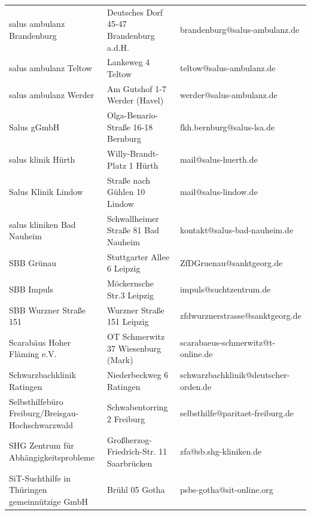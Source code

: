 {\begin{xltabular}{\textwidth} {
 >{\raggedright\arraybackslash}p{5cm}
 >{\raggedright\arraybackslash}X
 >{\raggedright\arraybackslash}p{5cm} }
salus ambulanz Brandenburg & Deutsches Dorf 45-47 Brandenburg a.d.H. & brandenburg@salus-ambulanz.de \\
salus ambulanz Teltow & Lankeweg 4 Teltow & teltow@salus-ambulanz.de \\
salus ambulanz Werder & Am Gutshof 1-7 Werder (Havel) & werder@salus-ambulanz.de \\
Salus gGmbH & Olga-Benario-Straße 16-18 Bernburg & fkh.bernburg@salus-lsa.de \\
salus klinik Hürth & Willy-Brandt-Platz 1 Hürth & mail@salus-huerth.de \\
Salus Klinik Lindow & Straße nach Gühlen 10 Lindow & mail@salus-lindow.de \\
salus kliniken Bad Nauheim & Schwallheimer Straße 81 Bad Nauheim & kontakt@salus-bad-nauheim.de \\
SBB Grünau & Stuttgarter Allee 6 Leipzig & ZfDGruenau@sanktgeorg.de \\
SBB Impuls & Möckernsche Str.3 Leipzig & impuls@suchtzentrum.de \\
SBB Wurzner Straße 151 & Wurzner Straße 151 Leipzig & zfdwurznerstrasse@sanktgeorg.de \\
Scarabäus Hoher Fläming e.V. & OT Schmerwitz 37 Wiesenburg (Mark) & scarabaeus-schmerwitz@t-online.de \\
Schwarzbachklinik Ratingen & Niederbeckweg 6 Ratingen & schwarzbachklinik@deutscher-orden.de \\
Selbsthilfebüro Freiburg/Breisgau-Hochschwarzwald & Schwabentorring 2 Freiburg & selbsthilfe@paritaet-freiburg.de \\
SHG Zentrum für Abhängigkeitsprobleme & Großherzog-Friedrich-Str. 11 Saarbrücken & zfa@sb.shg-kliniken.de \\
SiT-Suchthilfe in Thüringen gemeinnützige GmbH & Brühl 05 Gotha & psbs-gotha@sit-online.org \\

\end{xltabular}}
